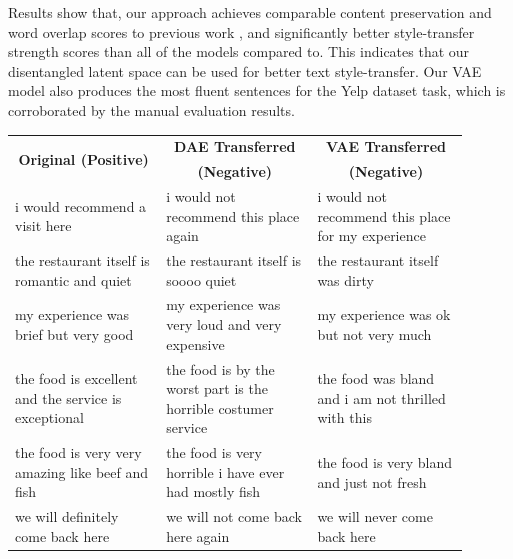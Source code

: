 \documentclass[letterpaper]{article} %
\newcommand{\tabh}[1]{\multicolumn{1}{c|}{\textbf{#1}}}
\newcommand{\tabc}[2]{\multicolumn{1}{|c||}{\multirow{#1}{*}{\textbf{#2}}}}
\begin{document}
Results show that, our approach achieves comparable content preservation and word overlap scores to previous work \cite{shen2017style,zhao2018adversarially}, and significantly better style-transfer strength scores than all of the models compared to. This indicates that our disentangled latent space can be used for better text style-transfer.
Our VAE model also produces the most fluent sentences for the Yelp dataset task, which is corroborated by the manual evaluation results.


\begin{table}[ht]
	\centering
	\small
	\begin{tabular}{| p{0.3\linewidth} || p{0.3\linewidth} | p{0.3\linewidth} |}
		\hline
		\tabc{2}{Original (Positive)}                          & \tabh{DAE Transferred}                                         & \tabh{VAE Transferred}                                      \\
		                                                       & \tabh{(Negative)}                                              & \tabh{(Negative)}                                           \\
		\hline
		\hline
		i would recommend a visit here                         & i would not recommend this place again                         & i would not recommend this place for my experience          \\
		\hline
		the restaurant itself is romantic and quiet            & the restaurant itself is soooo quiet                           & the restaurant itself was dirty                             \\
		\hline
		my experience was brief but very good                  & my experience was very loud and very expensive                 & my experience was ok but not very much                      \\
		\hline
		the food is excellent and the service is exceptional   & the food is by the worst part is the horrible costumer service & the food was bland and i am not thrilled with this          \\
		\hline
		the food is very very amazing like beef and fish       & the food is very horrible i have ever had mostly fish          & the food is very bland and just not fresh                   \\
		\hline
		we will definitely come back here                      & we will not come back here again                               & we will never come back here                                \\

\end{tabular}
\end{table}
\end{document}
